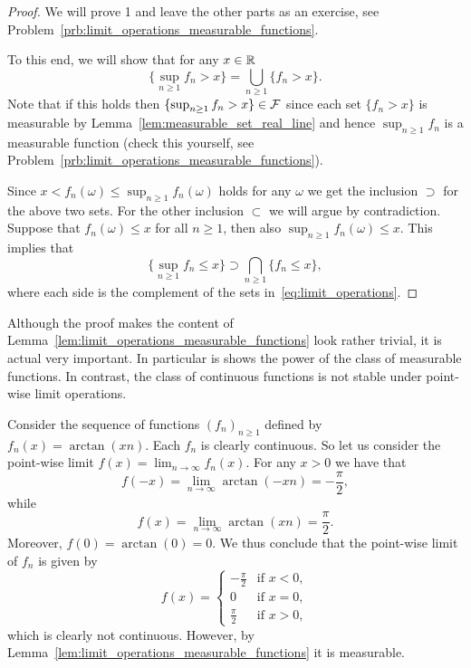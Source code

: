 \begin{proof}
We will prove 1 and leave the other parts as an exercise, see Problem~\ref{prb:limit_operations_measurable_functions}. 

To this end, we will show that for any $x \in \mathbb R$
\begin{equation}\label{eq:limit_operations}
	\{\sup_{n \ge 1} f_n > x\} = \bigcup_{n \ge 1} \{f_n > x\}.
\end{equation}
Note that if this holds then $\{\sup_{n \ge 1} f_n > x\} \in \mathcal F$ since each set $\{f_n > x\}$ is measurable by Lemma~\ref{lem:measurable_set_real_line} and hence $\sup_{n \ge 1} f_n$ is a measurable function (check this yourself, see Problem~\ref{prb:limit_operations_measurable_functions}).

Since $x < f_n(\omega) \le \sup_{n \ge 1} f_n(\omega)$ holds for any $\omega$ we get the inclusion $\supset$ for the above two sets. For the other inclusion $\subset$ we will argue by contradiction. Suppose that $f_n(\omega) \le x$ for all $n \ge 1$, then also $\sup_{n \ge 1} f_n(\omega) \le x$. This implies that
\[
	\{\sup_{n \ge 1} f_n \le x\} \supset \bigcap_{n \ge 1} \{f_n \le x\},
\] 
where each side is the complement of the sets in~\eqref{eq:limit_operations}.

\end{proof}

Although the proof makes the content of Lemma~\ref{lem:limit_operations_measurable_functions} look rather trivial, it is actual very important. In particular is shows the power of the class of measurable functions. In contrast, the class of continuous functions is not stable under point-wise limit operations. 

\begin{example}
Consider the sequence of functions $(f_n)_{n \ge 1}$ defined by $f_n(x) = \arctan(xn)$. Each $f_n$ is clearly continuous. So let us consider the point-wise limit $f(x) = \lim_{n \to \infty} f_n(x)$. For any $x > 0$ we have that
\[
	f(-x) = \lim_{n \to \infty} \arctan(-x n) = -\frac{\pi}{2},
\]
while
\[
	f(x) = \lim_{n \to \infty} \arctan(x n) = \frac{\pi}{2}.
\]
Moreover, $f(0) = \arctan(0) = 0$. We thus conclude that the point-wise limit of $f_n$ is given by
\[
	f(x) = \begin{cases}
		-\frac{\pi}{2} &\text{if } x < 0,\\
		0 &\text{if } x = 0,\\
		\frac{\pi}{2} &\text{if } x >0,
	\end{cases}
\]
which is clearly not continuous. However, by Lemma~\ref{lem:limit_operations_measurable_functions} it is measurable.
\end{example}

